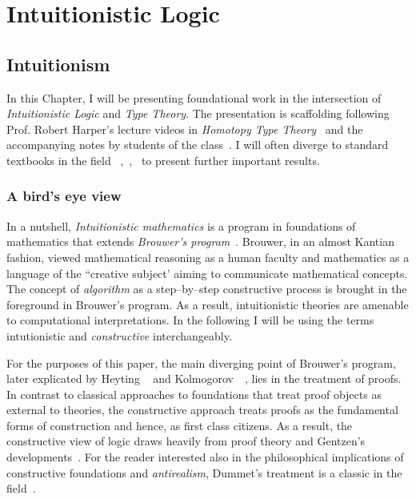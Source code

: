 \chapter{Intuitionistic Logic}\label{intui}
\section{Intuitionism}\label{sec:intrui}
In this Chapter, I will be presenting foundational work in the intersection of \emph{Intuitionistic Logic} and \emph{Type Theory}. The presentation is scaffolding following Prof. Robert Harper's lecture videos in \emph{Homotopy Type Theory}~\cite{HarperHOTT} and the accompanying notes by students of the class~\cite{HOTTNotes1}. I will often diverge to standard textbooks in the field ~\cite{Barendregt1984-BARTLC},~\cite{girard1989proofs},~\cite{Pierce:2002:TPL:509043} to present further important results. 
\subsection{A bird's eye view}  
In a nutshell, \emph{Intuitionistic mathematics}  is a program in foundations of mathematics  that extends \emph{Brouwer's program}~\cite{brouwer1975collected}.
Brouwer, in an almost Kantian fashion, viewed mathematical reasoning as a human faculty and mathematics as a language of the ``creative subject'
aiming to communicate mathematical concepts. The concept of \emph{algorithm} as a step--by--step constructive process is brought in the foreground in Brouwer's program. As a result, intuitionistic theories are amenable to computational interpretations. In the following I will be using the terms intutionistic and \emph{constructive} interchangeably.  

 For the purposes of this paper, the main diverging point of Brouwer's program, later explicated by Heyting ~\cite{heyting1966intuitionism} and Kolmogorov~\cite{kolmogorov1925principe}~\cite{artemov2004kolmogorov}, lies in the treatment of proofs. In contrast to classical approaches to foundations that treat proof objects as external to theories, the constructive approach treats proofs as the
 fundamental forms of construction and hence, as first class citizens. As a result, the constructive view of logic draws heavily from proof theory and Gentzen's developments~\cite{gentzen1970collected}. For the reader interested also in the philosophical implications  of constructive foundations and \emph{antirealism}, Dummet's treatment is a classic in the field~\cite{dummett2000elements}.    
 


